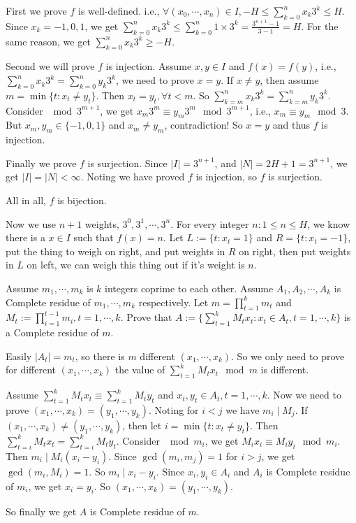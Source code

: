 \documentclass{ctexart}
\begin{document}
\begin{solution}
  First we prove \(f\) is well-defined. i.e., \(\forall (x_0,\cdots,x_n) \in I,-H \leq \sum_{k=0}^{n}x_k 3^k \leq H\).
  Since \(x_k=-1,0,1\), we get \(\sum_{k=0}^{n}x_k 3^k \leq \sum_{k=0}^{n}1 \times 3^k = \frac{3^{n + 1}-1}{3-1}=H\).
  For the same reason, we get \(\sum_{k=0}^{n}x_k 3^k \geq -H\).

  Second we will prove \(f\) is injection.
  Assume \(x,y \in I\) and \(f(x)=f(y)\), i.e., \(\sum_{k=0}^{n}x_k 3^k=\sum_{k=0}^{n}y_k 3^k\), we need to prove \(x=y\).
  If \(x \neq y\), then assume \(m=\min\{t:x_t \neq y_t\}\).
  Then \(x_t=y_t,\forall t<m\). So \(\sum_{k=m}^{n}x_k 3^k=\sum_{k=m}^{n}y_k3^k\).
  Consider \(\mod 3^{m+1}\), we get \(x_m 3^m \equiv y_m 3^m \mod 3^{m+1}\), i.e., \(x_m \equiv y_m \mod 3\).
  But \(x_m,y_m \in \{-1,0,1\}\) and \(x_m \neq y_m\), contradiction!
  So \(x=y\) and thus \(f\) is injection.

  Finally we prove \(f\) is surjection.
  Since \(|I|=3^{n+1}\), and \(|N|=2H+1=3^{n+1}\), we get \(|I|=|N|<\infty\).
  Noting we have proved \(f\) is injection, so \(f\) is surjection.

  All in all, \(f\) is bijection.

  Now we use \(n+1\) weights, \(3^0,3^1,\cdots,3^n\). For every integer \(n:1 \leq n \leq H\),
  we know there is a \(x \in I\) such that \(f(x)=n\).
  Let \(L:=\{t:x_t=1\}\) and \(R=\{t:x_t=-1\}\), put the thing to weigh on right,
  and put weights in \(R\) on right, then put weights in \(L\) on left, we can weigh this thing out if it's weight is \(n\).
\end{solution}
\begin{problem}\label{pro:p40.4}
  Assume \(m_1,\cdots,m_k\) is \(k\) integers coprime to each other.
  Assume \(A_1,A_2,\cdots,A_k\) is Complete residue of \(m_1,\cdots,m_k\) respectively.
  Let \(m=\prod_{t=1}^{k}m_t\) and \(M_t:=\prod_{i=1}^{t-1}m_i,t=1,\cdots,k\).
  Prove that \(A:=\{\sum_{t=1}^{k}M_t x_t:x_t \in A_t,t=1,\cdots,k\}\) is a Complete residue of \(m\).
\end{problem}
\begin{solution}
  Easily \(|A_t|=m_t\), so there is \(m\) different \((x_1,\cdots,x_k)\).
  So we only need to prove for different \((x_1,\cdots,x_k)\) the value of \(\sum_{t=1}^{k}M_t x_t \mod m\) is different.

  Assume \(\sum_{t=1}^{k}M_t x_t \equiv \sum_{t=1}^{k}M_t y_t\) and \(x_t,y_t \in A_t,t=1,\cdots,k\).
  Now we need to prove \((x_1,\cdots,x_k)=(y_1,\cdots,y_k)\).
  Noting for \(i < j\) we have \(m_i \mid M_j\).
  If \((x_1,\cdots,x_k) \neq (y_1,\cdots,y_k)\), then let \(i=\min\{t:x_t \neq y_t\}\).
  Then \(\sum_{t=i}^{k}M_t x_t=\sum_{t=i}^{k}M_t y_t\).
  Consider \(\mod m_i\), we get \(M_ix_i \equiv M_iy_i \mod m_i\).
  Then \(m_i \mid M_i(x_i-y_i)\).
  Since \(\gcd(m_i,m_j)=1\) for \(i > j\), we get \(\gcd(m_i,M_i)=1\).
  So \(m_i \mid x_i-y_i\).
  Since \(x_i,y_i \in A_i\) and \(A_i\) is Complete residue of \(m_i\), we get \(x_i=y_i\).
  So \((x_1,\cdots,x_k)=(y_1,\cdots,y_k)\).

  So finally we get \(A\) is Complete residue of \(m\).
\end{solution}
\end{document}
